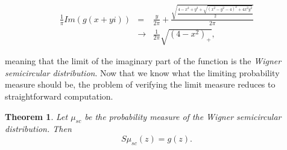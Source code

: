 \documentclass[12pt,a4paper,leqno]{report}
\theoremstyle{plain}
\newtheorem{theo}[equation]{Theorem}
\theoremstyle{definition}
\theoremstyle{remark}
\begin{document}
\begin{eqnarray*}
\frac{1}{\pi} Im(g(x+yi)) & = &
\frac{y}{2\pi} + \frac{\sqrt{\frac{4-x^2+y^2+\sqrt{(x^2-y^2-4)^2+4x^2y^2}}{2}}}{2\pi}\\
& \to & \frac{1}{2\pi} \sqrt{(4-x^2)_+},
\end{eqnarray*}

meaning that the limit of the imaginary part of the function is the \emph{Wigner semicircular distribution}. Now that we know what the limiting probability measure should be, the problem of verifying the limit measure reduces to straightforward computation.

\begin{theo}
Let $\mu_{sc}$ be the probability measure of the Wigner semicircular distribution. Then
\begin{equation*}
S\mu_{sc}(z) = g(z).
\end{equation*}
\end{theo}
\end{document}
